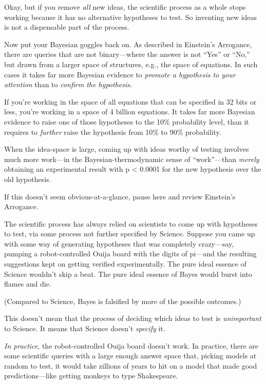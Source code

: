 {
 Okay, but if you remove \textit{all} new ideas, the scientific
process as a whole stops working because it has no alternative
hypotheses to test. So inventing new ideas is not a dispensable part of
the process.}

{
 Now put your Bayesian goggles back on. As described in
Einstein's Arrogance, there are queries that are not
binary---where the answer is not
``Yes'' or
``No,'' but drawn from a larger
space of structures, e.g., the space of equations. In such cases it
takes far more Bayesian evidence to \textit{promote a hypothesis to
your attention} than to \textit{confirm the hypothesis.}}

{
 If you're working in the space of all equations
that can be specified in 32 bits or less, you're
working in a space of 4 billion equations. It takes far more Bayesian
evidence to raise one of those hypotheses to the 10\% probability
level, than it requires to \textit{further} raise the hypothesis from
10\% to 90\% probability.}

{
 When the idea-space is large, coming up with ideas worthy of
testing involves much more work---in the Bayesian-thermodynamic sense
of ``work''---than \textit{merely}
obtaining an experimental result with p {\textless} 0.0001 for the new
hypothesis over the old hypothesis.}

{
 If this doesn't seem obvious-at-a-glance, pause
here and review Einstein's Arrogance.}

{
 The scientific process has always relied on scientists to come up
with hypotheses to test, via some process not further specified by
Science. Suppose you came up with some way of generating hypotheses
that was completely crazy---say, pumping a robot-controlled Ouija board
with the digits of pi---and the resulting suggestions kept on getting
verified experimentally. The pure ideal essence of Science
wouldn't skip a beat. The pure ideal essence of Bayes
would burst into flames and die.}

{
 (Compared to Science, Bayes is falsified by more of the possible
outcomes.)}

{
 This doesn't mean that the process of deciding
which ideas to test is \textit{unimportant} to Science. It means that
Science doesn't \textit{specify} it.}

{
 \textit{In practice}, the robot-controlled Ouija board
doesn't work. In practice, there are some scientific
queries with a large enough answer space that, picking models at random
to test, it would take zillions of years to hit on a model that made
good predictions---like getting monkeys to type Shakespeare.}

